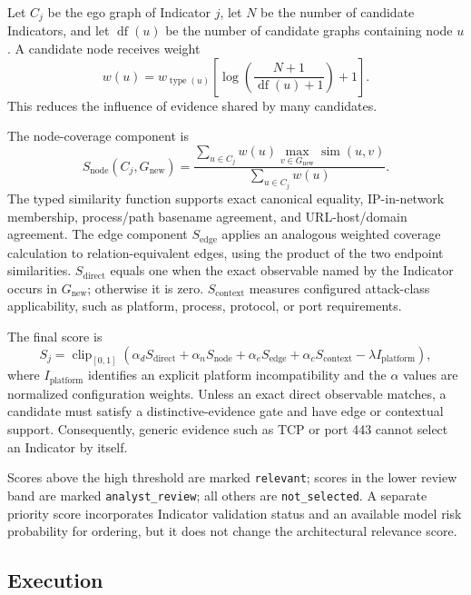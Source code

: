 Let $C_j$ be the ego graph of Indicator $j$, let $N$ be the number of candidate
Indicators, and let $\operatorname{df}(u)$ be the number of candidate graphs
containing node $u$. A candidate node receives weight
\begin{equation}
 w(u)=w_{\operatorname{type}(u)}
 \left[
 \log\left(\frac{N+1}{\operatorname{df}(u)+1}\right)+1
 \right].
\end{equation}
This reduces the influence of evidence shared by many candidates.

The node-coverage component is
\begin{equation}
 S_{\mathrm{node}}(C_j,G_{\mathrm{new}})=
 \frac{
 \sum_{u\in C_j}w(u)\max_{v\in G_{\mathrm{new}}}
 \operatorname{sim}(u,v)
 }{
 \sum_{u\in C_j}w(u)
 }.
\end{equation}
The typed similarity function supports exact canonical equality,
IP-in-network membership, process/path basename agreement, and URL-host/domain
agreement. The edge component $S_{\mathrm{edge}}$ applies an analogous weighted
coverage calculation to relation-equivalent edges, using the product of the
two endpoint similarities. $S_{\mathrm{direct}}$ equals one when the exact
observable named by the Indicator occurs in $G_{\mathrm{new}}$; otherwise it is
zero. $S_{\mathrm{context}}$ measures configured attack-class applicability,
such as platform, process, protocol, or port requirements.

The final score is
\begin{equation}
 S_j=\operatorname{clip}_{[0,1]}\left(
 \alpha_dS_{\mathrm{direct}}+
 \alpha_nS_{\mathrm{node}}+
 \alpha_eS_{\mathrm{edge}}+
 \alpha_cS_{\mathrm{context}}-
 \lambda I_{\mathrm{platform}}
 \right),
\end{equation}
where $I_{\mathrm{platform}}$ identifies an explicit platform incompatibility
and the $\alpha$ values are normalized configuration weights. Unless an exact
direct observable matches, a candidate must satisfy a distinctive-evidence
gate and have edge or contextual support. Consequently, generic evidence such
as TCP or port 443 cannot select an Indicator by itself.

Scores above the high threshold are marked \texttt{relevant}; scores in the
lower review band are marked \texttt{analyst\_review}; all others are
\texttt{not\_selected}. A separate priority score incorporates Indicator
validation status and an available model risk probability for ordering, but it
does not change the architectural relevance score.

\subsection{Execution}

